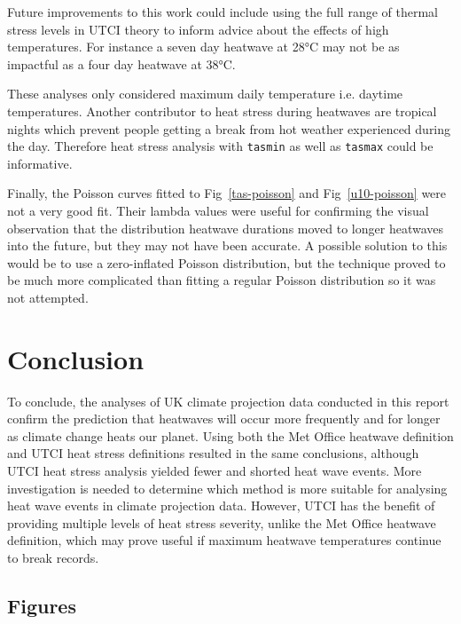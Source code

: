 \documentclass[10pt,letterpaper]{article}
\begin{document}
Future improvements to this work could include using the full range of thermal stress levels in UTCI theory to inform advice about the effects of high temperatures.
For instance a seven day heatwave at 28°C may not be as impactful as a four day heatwave at 38°C.

These analyses only considered maximum daily temperature i.e. daytime temperatures.
Another contributor to heat stress during heatwaves are tropical nights which prevent people getting a break from hot weather experienced during the day.
Therefore heat stress analysis with \texttt{tasmin} as well as \texttt{tasmax} could be informative.

Finally, the Poisson curves fitted to Fig~\ref{tas-poisson} and Fig~\ref{u10-poisson} were not a very good fit.
Their lambda values were useful for confirming the visual observation that the distribution heatwave durations moved to longer heatwaves into the future, but they may not have been accurate.
A possible solution to this would be to use a zero-inflated Poisson distribution, but the technique proved to be much more complicated than fitting a regular Poisson distribution so it was not attempted.


\section*{Conclusion}

To conclude, the analyses of UK climate projection data conducted in this report confirm the prediction that heatwaves will occur more frequently and for longer as climate change heats our planet.
Using both the Met Office heatwave definition and UTCI heat stress definitions resulted in the same conclusions, although UTCI heat stress analysis yielded fewer and shorted heat wave events.
More investigation is needed to determine which method is more suitable for analysing heat wave events in climate projection data.
However, UTCI has the benefit of providing multiple levels of heat stress severity, unlike the Met Office heatwave definition, which may prove useful if maximum heatwave temperatures continue to break records.







\pagebreak

\begin{adjustwidth}{-2.25in}{0in}
\section*{Figures}
\end{adjustwidth}
\end{document}
